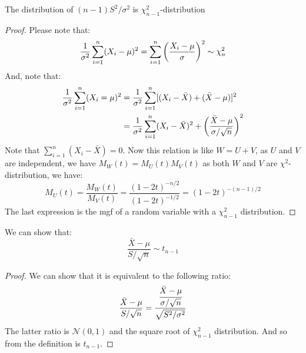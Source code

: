 \begin{theorem}
    The distribution of $(n-1)S^2/\sigma^2$ is $\chi^2_{n-1}$-distribution
\end{theorem}
\begin{proof}
    Please note that:
    \begin{equation*}
        \frac{1}{\sigma^2}\sum^n_{i=1}(X_i - \mu)^2 = \sum^n_{i=1}\left( \frac{X_i-\mu}{\sigma} \right)^2 \sim\chi_n^2
    \end{equation*}    
    And, note that:
    \begin{equation*}
    \begin{aligned}
        \frac{1}{\sigma^2}\sum^n_{i=1}(X_i = \mu)^2 &= \frac{1}{\sigma^2}\sum^n_{i=1}[(X_i - \bar{X}) + (\bar{X} - \mu)]^2 \\
        &= \frac{1}{\sigma^2}\sum^n_{i=1}(X_i - \bar{X})^2 + \left( \frac{\bar{X} - \mu}{\sigma/\sqrt{n}} \right)^2
    \end{aligned}
    \end{equation*}
    Note that $\sum^n_{i=1}(X_i-\bar{X}) = 0$. Now this relation is like $W = U + V$, as $U$ and $V$ are independent, we have $M_W(t)=M_U(t)M_V(t)$ as both $W$ and $V$ are $\chi^2$-distribution, we have:
    \begin{equation*}
        M_U(t) = \frac{M_W(t)}{M_V(t)} = \frac{(1-2t)^{-n/2}}{(1-2t)^{-1/2}} = (1-2t)^{-(n-1)/2}
    \end{equation*}
    The last expression is the mgf of a random variable with a $\chi^2_{n-1}$ distribution. 
\end{proof}

\begin{corollary}
    We can show that:
    \begin{equation*}
        \frac{\bar{X}-\mu}{S/\sqrt{n}} \sim t_{n-1}
    \end{equation*}
\end{corollary}
\begin{proof}
    We can show that it is equivalent to the following ratio:
    \begin{equation*}
        \frac{\bar{X}-\mu}{S/\sqrt{n}} = \frac{\cfrac{\bar{X}-\mu}{\sigma/\sqrt{n}}}{\sqrt{S^2/\sigma^2}}
    \end{equation*}
    The latter ratio is $\mathcal{N}(0, 1)$ and the square root of $\chi^2_{n-1}$ distribution. And so from the definition is $t_{n-1}$.
\end{proof}
